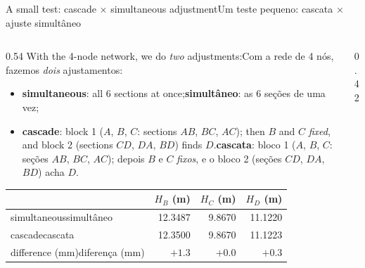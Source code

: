 \documentclass[aspectratio=169,11pt]{beamer}
\newcommand{\tr}[2]{\ifEN#2\else#1\fi}
\newcommand{\bnum}[1]{\ifmmode\textcolor{mTeal}{\mathbf{#1}}\else\textbf{\textcolor{mTeal}{#1}}\fi}
\begin{document}
\begin{frame}{\tr{Um teste pequeno: cascata $\times$ ajuste simultâneo}{A small test: cascade $\times$
simultaneous adjustment}}
  \begin{columns}[T]
    \begin{column}{0.54\textwidth}
      \small
      \tr{Com a rede de 4 nós, fazemos \emph{dois} ajustamentos:}{With the 4-node network, we do
      \emph{two} adjustments:}
      \begin{itemize}
        \setlength{\itemsep}{2pt}
        \item \tr{\textbf{simultâneo}: as 6 seções de uma vez;}{\textbf{simultaneous}: all 6
              sections at once;}
        \item \tr{\textbf{cascata}: bloco 1 ($A$, $B$, $C$: seções $AB$, $BC$, $AC$); depois $B$
              e $C$ \emph{fixos}, e o bloco 2 (seções $CD$, $DA$, $BD$) acha $D$.}{\textbf{cascade}:
              block 1 ($A$, $B$, $C$: sections $AB$, $BC$, $AC$); then $B$ and $C$ \emph{fixed},
              and block 2 (sections $CD$, $DA$, $BD$) finds $D$.}
      \end{itemize}
      \medskip
      \renewcommand{\arraystretch}{1.3}
      \begin{tabular}{@{}lrrr@{}}
        \toprule
        & $H_B$ (m) & $H_C$ (m) & $H_D$ (m) \\
        \midrule
        \tr{simultâneo}{simultaneous} & \num{12.3487} & \num{9.8670} & \num{11.1220} \\
        \tr{cascata}{cascade} & \num{12.3500} & \num{9.8670} & \num{11.1223} \\
        \tr{diferença (mm)}{difference (mm)} & \bnum{$+\num{1.3}$} & $+\num{0.0}$ & $+\num{0.3}$ \\
        \bottomrule
      \end{tabular}
    \end{column}
    \begin{column}{0.42\textwidth}
      \begin{cuidado}[title={\tr{Duas diferenças}{Two differences}}]
        \footnotesize
\end{cuidado}
\end{column}
\end{columns}
\end{frame}
\end{document}
